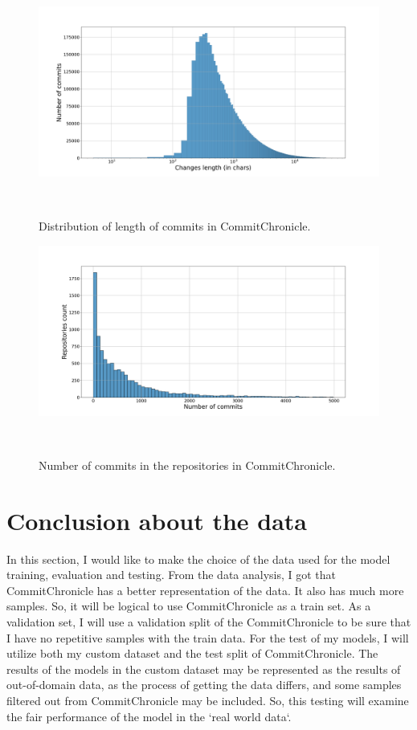 \begin{figure}[H]
    \includegraphics[scale=0.30]{figs/changes_len_dist_comchron.png}
    \caption{Distribution of length of commits in CommitChronicle.}~\label{fig:changes_len_dist_CommitChronicle}
\end{figure}

\begin{figure}[H]
    \includegraphics[scale=0.30]{figs/Commits distribution_comchron.png}
    \caption{Number of commits in the repositories in CommitChronicle.}~\label{fig:commits_distribution_CommitChronicle}
\end{figure}

\section{Conclusion about the data}
In this section, I would like to make the choice of the data used for the model training, evaluation and testing. From the data analysis, I got that CommitChronicle has a better representation of the data. It also has much more samples. So, it will be logical to use CommitChronicle as a train set. As a validation set, I will use a validation split of the CommitChronicle to be sure that I have no repetitive samples with the train data. For the test of my models, I will utilize both my custom dataset and the test split of CommitChronicle. The results of the models in the custom dataset may be represented as the results of out-of-domain data, as the process of getting the data differs, and some samples filtered out from CommitChronicle may be included.  So, this testing will examine the fair performance of the model in the `real world data`.


